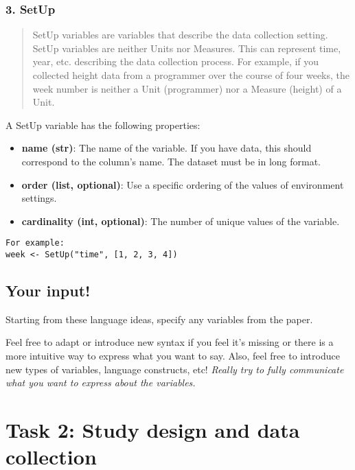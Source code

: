\subsubsection{3. SetUp}\label{setup}

\begin{quote}
SetUp variables are variables that describe the data collection setting.
SetUp variables are neither Units nor Measures. This can represent time,
year, etc. describing the data collection process. For example, if you
collected height data from a programmer over the course of four weeks,
the week number is neither a Unit (programmer) nor a Measure (height) of
a Unit.
\end{quote}

A SetUp variable has the following properties:
\begin{itemize}
    \item \textbf{name (str)}: The name of the variable. If you have data, this should correspond to the column’s name. The dataset must be in long format.
    \item \textbf{order (list, optional)}: Use a specific ordering of the values of environment settings.
    \item \textbf{cardinality (int, optional)}: The number of unique values of the variable.
\end{itemize}

\begin{verbatim}
For example:
week <- SetUp("time", [1, 2, 3, 4])
\end{verbatim}

\subsection*{Your input!}

Starting from these language ideas, specify any variables from the
paper.

Feel free to adapt or introduce new syntax if you feel it's missing or
there is a more intuitive way to express what you want to say. Also,
feel free to introduce new types of variables, language constructs, etc!
\emph{Really try to fully communicate what you want to express about the
variables.}
\clearpage



\section{Task 2: Study design and data collection}

